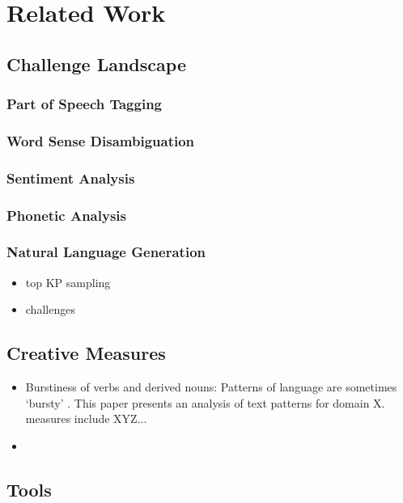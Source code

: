 \chapter{Related Work}

\section{Challenge Landscape}

\subsection{Part of Speech Tagging}

\subsection{Word Sense Disambiguation}

\subsection{Sentiment Analysis}

\subsection{Phonetic Analysis}

\subsection{Natural Language Generation}
\begin{itemize}
    \item top KP sampling
    \item challenges 
\end{itemize}


\section{Creative Measures}
\begin{itemize}
    \item Burstiness of verbs and derived nouns: Patterns of language are sometimes `bursty' \cite{pierrehumbert2012burstiness}. This paper presents an analysis of text patterns for domain X. measures include XYZ...
    \item 
\end{itemize}

\section{Tools}
